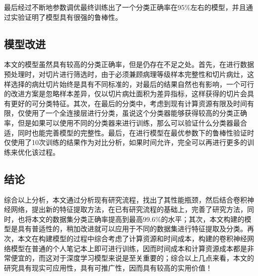 \documentclass{ctexart}
\begin{document}
最后经过不断地参数调优最终训练出了一个分类正确率在95\%左右的模型，并且通过实验证明了模型具有很强的鲁棒性。


\subsection{模型改进}
本文的模型虽然具有较高的分类正确率，但是仍存在不足之处。首先，在进行数据预处理时，对切片进行筛选时，由于必须兼顾病理等级样本完整性和切片病灶，这样选择的病灶切片始终是具有不同标准的，对最后的结果自然也有影响，一个可行的改进方案是忽略样本差异，仅以切片病灶面积为差异指标，这样获得的切片会具有更好的可分类特征。其次，在最后的分类中，考虑到现有计算资源有限及时间有限，仅使用了一个全连接层进行分类，虽说这个分类器能够获得较高的分类正确率，但是如果可以使用不同的分类器来进行训练，那么可以验证什么分类器最合适，同时也能完善模型的完整性。最后，在进行模型在最优参数下的鲁棒性验证时仅使用了10次训练的结果作为对比分析，如果时间允许，完全可以再进行更多的训练来优化该过程。

\subsection{结论}
综合以上分析，本文通过分析现有研究流程，找出了其性能瓶颈，然后结合卷积神经网络，提出新的特征提取方法，在已有研究流程的基础上，完善了研究方法，同时，也将本文的数据集分类正确率提高到最高99.6\%的水平；其次，本文构建的模型是具有普适性的，稍加改进就可以应用于不同的数据集进行特征提取及分类。再次，本文在构建模型的过程中综合考虑了计算资源和时间成本，构建的卷积神经网络模型在普通的个人笔记本上即可进行训练，因而时间成本和计算资源成本都是非常便宜的，而这对于深度学习模型来说是至关重要的；综合以上几点来看，本文的研究具有现实可应用性，具有可推广性，因而具有较高的实用价值！
\end{document}
